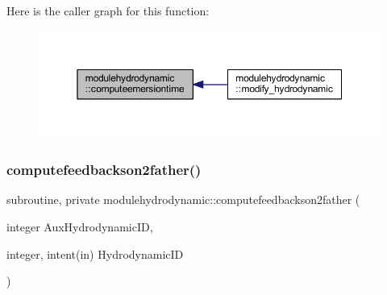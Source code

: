 Here is the caller graph for this function\+:\nopagebreak
\begin{figure}[H]
\begin{center}
\leavevmode
\includegraphics[width=350pt]{namespacemodulehydrodynamic_a15232a4b6e4a92f5147fcf1428ebe0c0_icgraph}
\end{center}
\end{figure}
\mbox{\label{namespacemodulehydrodynamic_a83eb2d1806304e7bfac59fbf155291e4}} 
\subsubsection{\texorpdfstring{computefeedbackson2father()}{computefeedbackson2father()}}
{\footnotesize\ttfamily subroutine, private modulehydrodynamic\+::computefeedbackson2father (\begin{DoxyParamCaption}\item[{integer}]{Aux\+Hydrodynamic\+ID,  }\item[{integer, intent(in)}]{Hydrodynamic\+ID }\end{DoxyParamCaption})\hspace{0.3cm}{\ttfamily [private]}}


